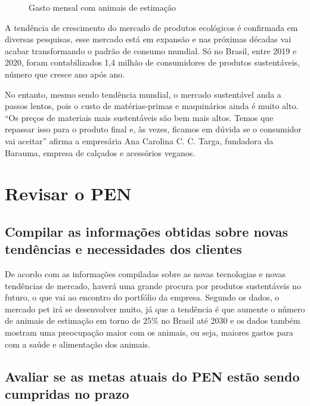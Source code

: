 \documentclass[
	12pt,				%
	openright,			%
	oneside,			%
	a4paper,			%
	english,			%
	french,				%
	spanish,			%
	brazil				%
	]{abntex2}
\begin{document}
\begin{figure}[H]
\centering
\caption{Gasto mensal com animais de estimação}
\quad %
\label{figcusto}
\end{figure}

A tendência de crescimento do mercado de produtos ecológicos é confirmada em diversas pesquisas, esse mercado está em expansão e nas próximas décadas vai acabar transformando o padrão de consumo mundial. Só no Brasil, entre 2019 e 2020, foram contabilizados 1,4 milhão de consumidores de produtos sustentáveis, número que cresce ano após ano. \cite{noticia}

No entanto, mesmo sendo tendência mundial, o mercado sustentável anda a passos lentos, pois o custo de matérias-primas e maquinários ainda é muito alto. “Os preços de materiais mais sustentáveis são bem mais altos. Temos que repassar isso para o produto final e, às vezes, ficamos em dúvida se o consumidor vai aceitar” afirma a empresária Ana Carolina C. C. Targa, fundadora da Barauma, empresa de calçados e acessórios veganos. \cite{folha}



\section{Revisar o PEN}

\subsection*{Compilar as informações obtidas sobre novas tendências e necessidades dos clientes}

De acordo com as informações compiladas sobre as novas tecnologias e novas tendências de mercado, haverá uma grande procura por produtos sustentáveis no futuro, o que vai ao encontro do portfólio da empresa. Segundo os dados, o mercado pet irá se desenvolver muito, já que a tendência é que aumente o número de animais de estimação em torno de 25$\%$ no Brasil até 2030 e os dados também mostram uma preocupação maior com os animais, ou seja, maiores gastos para com a saúde e alimentação dos animais. 


\subsection*{Avaliar se as metas atuais do PEN estão sendo cumpridas no prazo}
\end{document}
